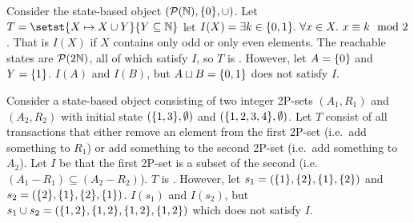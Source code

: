 \begin{example}
  Consider the state-based object $(\mathcal{P}(\mathbb{N}), \{0\}, \cup)$. Let $T =
  \setst{X \mapsto X \cup Y}{Y \subseteq \nats}$ let $I(X) = \exists k \in
  \{0, 1\}.\ \forall x \in X.\ x \equiv k \mod 2$. That is $I(X)$ if $X$
  contains only odd or only even elements. The reachable states are
  $\mathcal{P}(2\mathbb{N})$, all of which satisfy $I$, so $T$ is \Iconfluent{}.
  However, let $A = \{0\}$ and $Y = \{1\}$. $I(A)$ and $I(B)$, but $A \sqcup
  B = \{0, 1\}$ does not satisfy $I$.
\end{example}

\begin{example}
  Consider a state-based object consisting of two integer 2P-sets $(A_1, R_1)$ and
  $(A_2, R_2)$ with initial state $(\{1, 3\}, \emptyset{})$ and $(\{1, 2,
  3, 4\}, \emptyset{})$. Let $T$ consist of all transactions that either remove
  an element from the first 2P-set (i.e.\ add something to $R_1$) or add
  something to the second 2P-set (i.e.\ add something to $A_2$). Let $I$ be
  that the first 2P-set is a subset of the second (i.e. $(A_1 - R_1) \subseteq
  (A_2 - R_2)$).
  $T$ is \Iconfluent{}. However, let $s_1 = (\{1\}, \{2\}, \{1\},
  \{2\})$ and $s_2 = (\{2\}, \{1\}, \{2\}, \{1\})$. $I(s_1)$ and
  $I(s_2)$, but $s_1 \cup s_2 = (\{1, 2\}, \{1, 2\}, \{1, 2\}, \{1,
  2\})$ which does not satisfy $I$.
\end{example}

